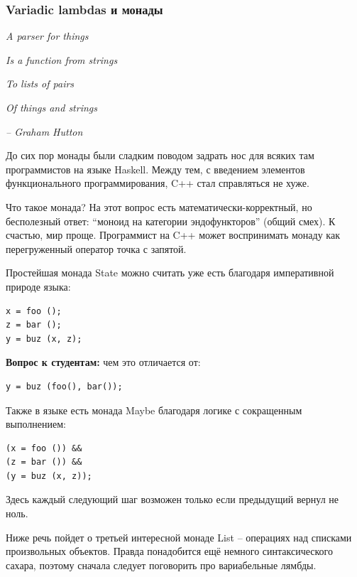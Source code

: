 \documentclass[a4paper,12pt,oneside]{article}
\newif\ifanswers
\begin{document}
\ifanswers
Правильный ответ: просто вызвать.
\fi

\subsubsection{Variadic lambdas и монады}\label{Monads}

\hfill\textit{A parser for things}

\hfill\textit{Is a function from strings}

\hfill\textit{To lists of pairs}

\hfill\textit{Of things and strings}{\vspace{0.5em}}

\hfill\textit{-- Graham Hutton}

До сих пор монады были сладким поводом задрать нос для всяких там программистов на языке Haskell. Между тем, с введением элементов функционального программирования, C++ стал справляться не хуже.

Что такое монада? На этот вопрос есть математически-корректный, но бесполезный ответ: ``моноид на категории эндофункторов'' (общий смех). К счастью, мир проще. Программист на C++ может воспринимать монаду как перегруженный оператор точка с запятой.

Простейшая монада State можно считать уже есть благодаря императивной природе языка:

\begin{lstlisting}
x = foo ();
z = bar ();
y = buz (x, z);
\end{lstlisting}

\textbf{Вопрос к студентам:} чем это отличается от:

\begin{lstlisting}
y = buz (foo(), bar());
\end{lstlisting}

\ifanswers
Правильный ответ: задана последовательность выполнения функций \lstinline!foo! и \lstinline!bar! 
\fi

Также в языке есть монада Maybe благодаря логике с сокращенным выполнением:

\begin{lstlisting}
(x = foo ()) &&
(z = bar ()) &&
(y = buz (x, z));
\end{lstlisting}

Здесь каждый следующий шаг возможен только если предыдущий вернул не ноль.

Ниже речь пойдет о третьей интересной монаде List -- операциях над списками произвольных объектов. Правда понадобится ещё немного синтаксического сахара, поэтому сначала следует поговорить про вариабельные лямбды.
\end{document}
